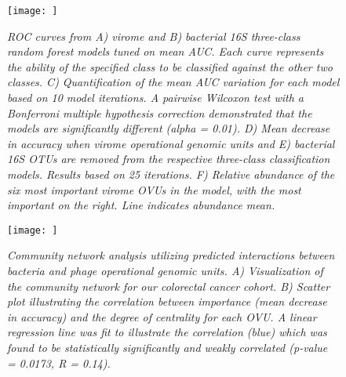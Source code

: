 \documentclass[12pt,]{article}
\begin{document}
\begin{figure}[htbp]
\centering
\texttt{[image: ]}
\caption{\emph{ROC curves from A) virome and B) bacterial 16S
three-class random forest models tuned on mean AUC. Each curve
represents the ability of the specified class to be classified against
the other two classes. C) Quantification of the mean AUC variation for
each model based on 10 model iterations. A pairwise Wilcoxon test with a
Bonferroni multiple hypothesis correction demonstrated that the models
are significantly different (alpha = 0.01). D) Mean decrease in accuracy
when virome operational genomic units and E) bacterial 16S OTUs are
removed from the respective three-class classification models. Results
based on 25 iterations. F) Relative abundance of the six most important
virome OVUs in the model, with the most important on the right. Line
indicates abundance mean.}\label{threewaymodel}}
\end{figure}

\newpage

\begin{figure}[htbp]
\centering
\texttt{[image: ]}
\caption{\emph{Community network analysis utilizing predicted
interactions between bacteria and phage operational genomic units. A)
Visualization of the community network for our colorectal cancer cohort.
B) Scatter plot illustrating the correlation between importance (mean
decrease in accuracy) and the degree of centrality for each OVU. A
linear regression line was fit to illustrate the correlation (blue)
which was found to be statistically significantly and weakly correlated
(p-value = 0.0173, R = 0.14).}\label{network}}
\end{figure}
\end{document}

